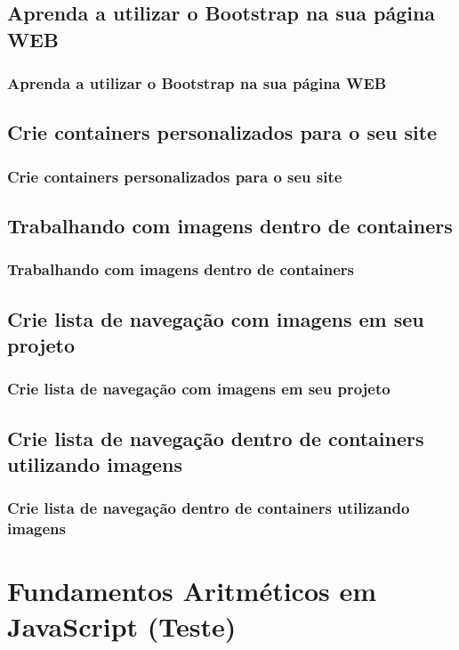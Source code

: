 \documentclass[12pt,a4paper]{article}
\begin{document}
	
	\subsection{Aprenda a utilizar o Bootstrap na sua página WEB}
	\subsubsection{Aprenda a utilizar o Bootstrap na sua página WEB}
	
	
	\subsection{Crie containers personalizados para o seu site}
	\subsubsection{Crie containers personalizados para o seu site}
	
	
	\subsection{Trabalhando com imagens dentro de containers}
	\subsubsection{Trabalhando com imagens dentro de containers}
	
	
	\subsection{Crie lista de navegação com imagens em seu projeto}
	\subsubsection{Crie lista de navegação com imagens em seu projeto}
	
	
	\subsection{Crie lista de navegação dentro de containers utilizando imagens}
	\subsubsection{Crie lista de navegação dentro de containers utilizando imagens}
	
	
	\section{Fundamentos Aritméticos em JavaScript (Teste)}
	
\end{document}
